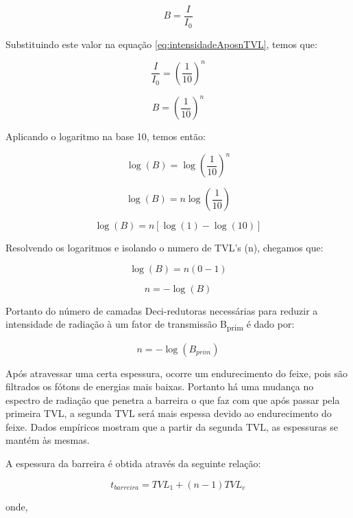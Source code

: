 \documentclass[11pt,a4paper]{article}
\begin{document}
            $$B = \frac{I}{I_0}$$

            Substituindo este valor na equação \ref{eq:intensidadeAposnTVL}, temos que:

            $$\frac{I}{I_0} = \left(\frac{1}{10}\right)^n $$

            \begin{equation}
                B = \left(\frac{1}{10}\right)^n
                \label{eq:fatorTransmissaoBase10}
            \end{equation}
            

            Aplicando o logaritmo na base 10, temos então:

            $$\log (B) = \log \left(\frac{1}{10}\right)^n $$

            $$\log (B) = n \log \left(\frac{1}{10}\right) $$

            $$\log (B) = n [\log (1) - \log (10) ]$$

           Resolvendo os logaritmos e isolando o numero de TVL's (n), chegamos que:

            $$\log (B) = n (0 - 1)$$
          
            $$ n = - \log(B) $$
           
            Portanto do número de camadas Deci-redutoras necessárias para reduzir a intensidade de radiação à um fator de transmissão B\textsubscript{prim} é dado por:

            \begin{equation}
                n = - \log (B_{prim})
            \end{equation}

            Após atravessar uma certa espessura, ocorre um endurecimento do feixe, pois são filtrados os fótons de energias mais baixas. Portanto há uma mudança no espectro de radiação que penetra a barreira o que faz com que após passar pela primeira TVL, a segunda TVL será mais espessa devido ao endurecimento do feixe. Dados empíricos mostram que a partir da segunda TVL, as espessuras se mantém às mesmas. 

            A espessura da barreira é obtida através da seguinte relação:

            \begin{equation}
                t_{barreira} = TVL_1 + (n - 1)TVL_e
                \label{ eq:espessuraBarreira}
            \end{equation}


            onde, 
\end{document}
